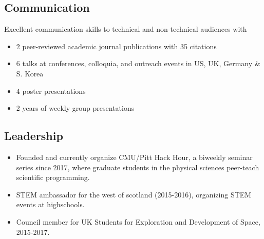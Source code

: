 \documentclass[11pt,letterpaper,sans]{moderncv}        %
\begin{document}
\subsection{Communication}
Excellent communication skills to technical and non-technical audiences with
\begin{itemize}

\item 2 peer-reviewed academic journal publications with 35 citations
\item 6 talks at conferences, colloquia, and outreach events in US, UK, Germany \& S. Korea
\item 4 poster presentations
\item 2 years of weekly group presentations
\end{itemize}

\subsection{Leadership}
\begin{itemize}
    \item Founded and currently organize CMU/Pitt Hack Hour, a biweekly seminar series since 2017, where graduate students in the physical sciences peer-teach scientific programming.
    \item STEM ambassador for the west of scotland (2015-2016), organizing STEM events at highschools.
    \item Council member for UK Students for Exploration and Development of Space, 2015-2017.
\end{itemize}


\end{document}
